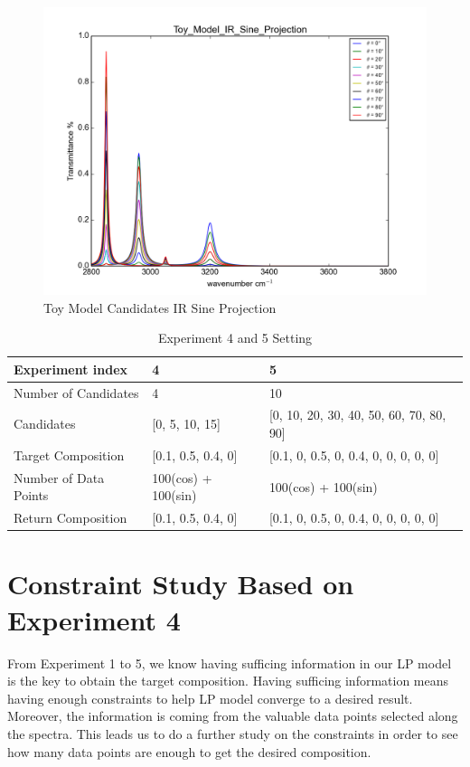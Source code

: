 \begin{figure}[!ht] \label{fig:3.4}
\centering
\includegraphics[scale=0.7]{Figures/Toy_Model_IR_Sine_Projection.png} 
\caption{Toy Model Candidates IR Sine Projection} 
\end{figure}

\begin{table} \label{tab:3.3}
\begin{center}
\begin{tabular}{| l | p{5cm} | l |}
\hline
Experiment index & 4 & 5\\
\hline
Number of Candidates & 4 & 10 \\
\hline
Candidates & [0, 5, 10, 15] & [0, 10, 20, 30, 40, 50, 60, 70, 80, 90] \\
\hline
Target Composition & [0.1, 0.5, 0.4, 0] & [0.1, 0, 0.5, 0, 0.4, 0, 0, 0, 0, 0]\\
\hline
Number of Data Points & 100(cos) + 100(sin) & 100(cos) + 100(sin)\\
\hline
Return Composition & [0.1, 0.5, 0.4, 0] & [0.1, 0, 0.5, 0, 0.4, 0, 0, 0, 0, 0] \\
\hline
\end{tabular} 
\caption{Experiment 4 and 5 Setting}
\end{center}
\end{table}		

\section{Constraint Study Based on Experiment 4}

From Experiment 1 to 5, we know having sufficing information in our LP model is the key to obtain the target composition. Having sufficing information means having enough constraints to help LP model converge to a desired result. Moreover, the information is coming from the valuable data points selected along the spectra. This leads us to do a further study on the constraints in order to see how many data points are enough to get the desired composition.\\ 

